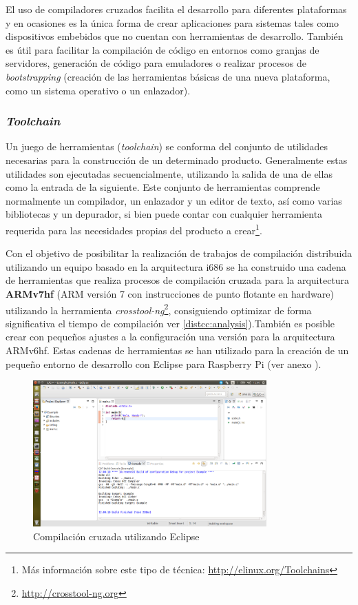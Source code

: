 El uso de compiladores cruzados facilita el desarrollo para diferentes plataformas y en ocasiones es la única forma de crear aplicaciones para sistemas tales como dispositivos embebidos que no cuentan con herramientas de desarrollo. También es útil para facilitar la compilación de código en entornos como granjas de servidores, generación de código para emuladores o realizar procesos de \textit{bootstrapping} (creación de las herramientas básicas de una nueva plataforma, como un sistema operativo o un enlazador).

\subsubsection{\textit{Toolchain}}
\label{crosstool-ng}
Un juego de herramientas (\textit{toolchain}) se conforma del conjunto de utilidades necesarias para la construcción de un determinado producto. Generalmente estas utilidades son ejecutadas secuencialmente, utilizando la salida de una de ellas como la entrada de la siguiente. Este conjunto de herramientas comprende normalmente un compilador, un enlazador y un editor de texto, así como varias bibliotecas y un depurador, si bien puede contar con cualquier herramienta requerida para las necesidades propias del producto a crear\footnote{Más información sobre este tipo de técnica: \href{http://elinux.org/Toolchains}{http://elinux.org/Toolchains}}.

Con el objetivo de posibilitar la realización de trabajos de compilación distribuida utilizando un equipo basado en la arquitectura i686 se ha construido una cadena de herramientas que realiza procesos de compilación cruzada para la arquitectura \textbf{ARMv7hf} (ARM versión 7 con instrucciones de punto flotante en hardware) utilizando la herramienta \textit{crosstool-ng}\footnote{\href{http://www.crosstool-ng.org/}{http://crosstool-ng.org}}, consiguiendo optimizar de forma significativa el tiempo de compilación ver \ref{distcc:analysis}).También es posible crear con pequeños ajustes a la configuración una versión para la arquitectura ARMv6hf. Estas cadenas de  herramientas se han utilizado para la creación de un pequeño entorno de desarrollo con Eclipse para Raspberry Pi (ver anexo \citationneeded[TODO]).


\begin{figure}[H]
\centering
\includegraphics[width=0.8\textwidth]{Chapters/Chapter2/Figures/raspbeclipse}
\caption{Compilación cruzada utilizando Eclipse}
\end{figure}


